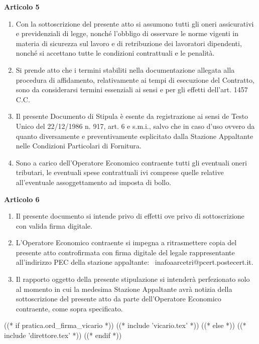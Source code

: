 \textbf{Articolo 5}

\begin{enumerate}
	\item Con la sottoscrizione del presente atto si assumono tutti gli oneri
assicurativi e previdenziali di legge, nonché l'obbligo di osservare
le norme vigenti in materia di sicurezza sul lavoro e di retribuzione
dei lavoratori dipendenti, nonché si accettano tutte le condizioni
contrattuali e le penalità.

\item Si prende atto che i termini stabiliti nella documentazione allegata
alla procedura di affidamento, relativamente ai tempi di esecuzione del
Contratto, sono da considerarsi termini essenziali ai sensi e per gli
effetti dell'art. 1457 C.C.

\item Il presente Documento di Stipula è esente da registrazione ai sensi de
Testo Unico del 22/12/1986 n. 917, art. 6 e s.m.i., salvo che in caso
d'uso ovvero da quanto diversamente e preventivamente esplicitato dalla
Stazione Appaltante nelle Condizioni Particolari di Fornitura.

\item Sono a carico dell'Operatore Economico contraente tutti gli eventuali
oneri tributari, le eventuali spese contrattuali ivi comprese quelle
relative all'eventuale assoggettamento ad imposta di bollo.
\end{enumerate}

\textbf{Articolo 6}

\begin{enumerate}
	\item Il presente documento si intende privo di effetti ove privo di
sottoscrizione con valida firma digitale.

\item L'Operatore Economico contraente si impegna a ritrasmettere copia
del presente atto controfirmata con firma digitale del legale
rappresentante all'indirizzo PEC della stazione appaltante:
 inafoaarcetri@pcert.postecert.it.

\item Il rapporto oggetto della presente stipulazione si intenderà perfezionato
solo al momento in cui la medesima Stazione Appaltante avrà notizia
della sottoscrizione del presente atto da parte dell'Operatore Economico
contraente, come sopra specificato.
\end{enumerate}

((* if pratica.ord_firma_vicario *))
((* include 'vicario.tex' *))
((* else *))
((* include 'direttore.tex' *))
((* endif *))

